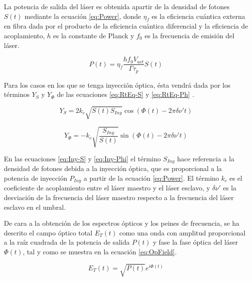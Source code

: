 	La potencia de salida del l\'aser es obtenida apartir de la densidad de fotones $S(t)$ mediante la ecuaci\'on \ref{eq:Power}, donde $\eta_f$ es la eficiencia cu\'antica externa en fibra dada por el producto de la eficiencia cu\'antica diferencial y la eficiencia de acoplamiento, $h$ es la constante de Planck y $f_0$ es la frecuencia de emisión del l\'aser.

	\begin{equation}
		P(t) = \eta_f \frac{h f_0 V_{act}}{\Gamma \tau_p} S(t)
		\label{eq:Power}
	\end{equation}

	Para los casos en los que se tenga inyecci\'on \'optica, \'esta vendr\'a dada por los t\'erminos $Y_S$ y $Y_{\Phi}$ de las ecuaciones \ref{eq:RtEq-S} y \ref{eq:RtEq-Ph} \cite{schunk1986noise}.

	\begin{equation}
		Y_S = 2k_c\sqrt{S(t)S_{Iny}} \cos(\Phi(t) - 2\pi \delta\nu't)
		\label{eq:Iny-S}
	\end{equation}

	\begin{equation}
		Y_{\Phi} = -k_c\sqrt{\frac{S_{Iny}}{S(t)}} \sin(\Phi(t) - 2\pi \delta\nu't)
		\label{eq:Iny-Phi}
	\end{equation}

En las ecuaciones \ref{eq:Iny-S} y \ref{eq:Iny-Phi} el t\'ermino $S_{Iny}$ hace referencia a la densidad de fotones debida a la inyecci\'on \'optica, que es proporcional a la potencia de inyecci\'on $P_{Iny}$ a partir de la ecuación \ref{eq:Power}. El t\'ermino $k_c$ es el coeficiente de acoplamiento entre el l\'aser maestro y el l\'aser esclavo, y $\delta \nu'$ es la desviaci\'on de la frecuencia del l\'aser maestro respecto a la frecuencia del l\'aser esclavo en el umbral.

De cara a la obtenci\'on de los espectros \'opticos y los peines de frecuencia, se ha descrito el campo \'optico total $E_T(t)$ como una onda con amplitud proporcional a la raíz cuadrada de la potencia de salida $P(t)$ y fase la fase \'optica del l\'aser $\Phi(t)$, tal y como se muestra en la ecuaci\'on \ref{eq:OpField}.

	\begin{equation}
		E_T(t) = \sqrt{P(t)} e^{i \Phi(t)}
		\label{eq:OpField}
	\end{equation}

